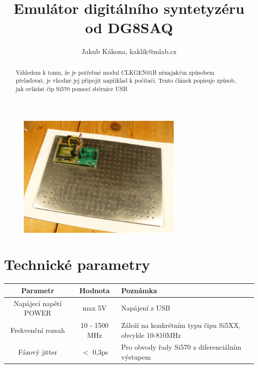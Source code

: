 \documentclass[12pt,a4paper,oneside]{article}
\begin{document}
\title{Emulátor digitálního syntetyzéru od DG8SAQ}
\author{Jakub Kákona, kaklik@mlab.cz}
\maketitle

\thispagestyle{empty}
\begin{abstract}
Vzhledem k tomu, že je potřebné modul CLKGEN01B něnajakým způsobem přelaďovat, je vhodné jej připojit například k počítači. Tento článek popisuje způsob, jak ovládat čip Si570 pomocí sběrnice USB. 
\end{abstract}

\begin{figure} [htbp]
\begin{center}
\includegraphics [width=80mm] {DG8SAQ_emulator_Big.jpg} 
\end{center}
\end{figure}

\tableofcontents

\section{Technické parametry}
\begin{table}[htbp]
\begin{center}
\begin{tabular}{|c|c|p{4.7cm}|}
\hline
Parametr & Hodnota & Poznámka \\
\hline
Napájecí napětí POWER  & max 5V &  Napájení z USB\\ 
\hline
Frekvenční rozsah  & 10 - 1500 MHz & Záleží na konkrétním typu čipu Si5XX, obvykle 10-810MHz \\ 
\hline
Fázový jitter  & $<$ 0,3ps & Pro obvody řady Si570 z diferenciálním výstupem\\ 
\hline
\end{tabular}
\end{center}
\end{table}
\end{document}
